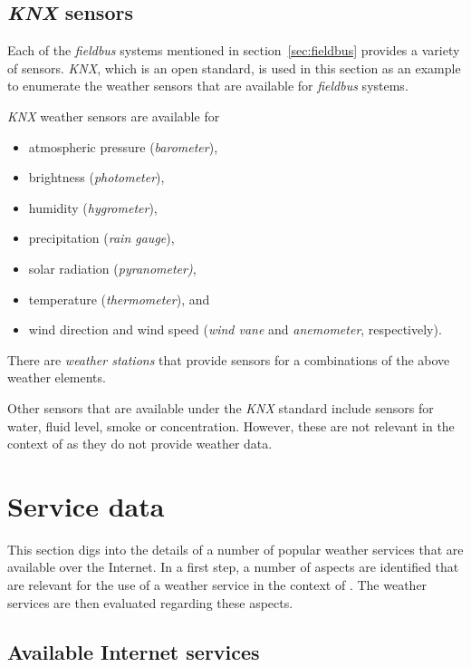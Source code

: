 \subsection{\emph{KNX} sensors}

Each of the \emph{fieldbus} systems mentioned in section~\ref{sec:fieldbus} provides a variety of sensors. \emph{KNX}, which is an open standard, is used in this section as an example to enumerate the weather sensors that are available for \emph{fieldbus} systems.

\emph{KNX} weather sensors are available for
\begin{itemize}
  \item atmospheric pressure (\emph{barometer}),
  \item brightness (\emph{photometer}), %
  \item humidity (\emph{hygrometer}),
  \item precipitation (\emph{rain gauge}),
  \item solar radiation (\emph{pyranometer)},
  \item temperature (\emph{thermometer}), and
  \item wind direction and wind speed (\emph{wind vane} and \emph{anemometer}, respectively).
\end{itemize}

There are \emph{weather stations} that provide sensors for a combinations of the above weather elements.

Other sensors that are available under the \emph{KNX} standard include sensors for water, fluid level, smoke or  concentration. However, these are not relevant in the context of \thinkhomeweather as they do not provide weather data.


\section{Service data}
\label{sec:weather_services}

This section digs into the details of a number of popular weather services that are available over the Internet. In a first step, a number of aspects are identified that are relevant for the use of a weather service in the context of \thinkhome. The weather services are then evaluated regarding these aspects.

\subsection{Available Internet services}
\label{sec:internet_services}


